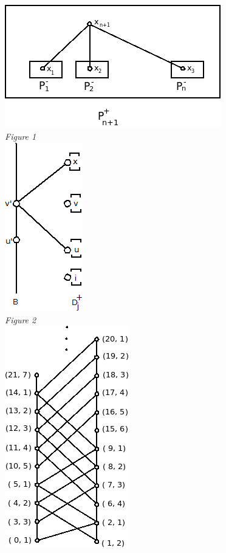 \documentclass[twoside]{article}
\begin{document}
\vspace{1cm}
\begin{center}
\includegraphics[scale=0.5]{figures/Figure1.png}\\
\textit{Figure 1}\\
\vspace{1cm}
\includegraphics[scale=0.5]{figures/Figure2.png}\\
\textit{Figure 2}\\
\vspace{1cm}
\includegraphics[scale=0.5]{figures/Figure3.png}\\

\end{center}
\end{document}
